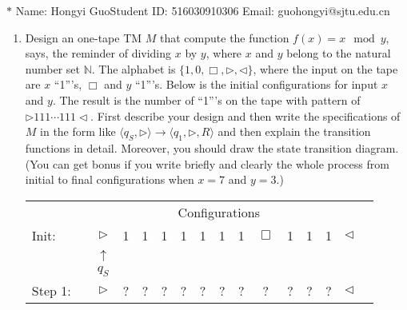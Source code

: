 \documentclass[12pt,a4paper]{article}
\theoremstyle{definition}
\begin{document}
\noindent

\noindent{}
\begin{center}
\footnotesize{\color{blue}$*$ Name: Hongyi Guo\quad Student ID: 516030910306 \quad Email: guohongyi@sjtu.edu.cn}
\end{center}

\begin{enumerate}
\item
Design an one-tape TM $M$ that compute the function $f(x) = x\mod y $, says, the reminder of dividing $x$ by $y$, where $x$ and $y$ belong to the natural number set $\mathbb{N}$. The alphabet is $\{1, 0, \Box, \triangleright, \triangleleft\}$, where the input on the tape are $x$ ``1'''s, $\Box$ and $y$ ``1'''s. Below is the initial configurations for input $x$ and $y$. The result is the number of ``1'''s on the tape with pattern of $\triangleright 111\cdots 111 \triangleleft$. First describe your design and then write the specifications of $M$ in the form like $\langle q_S, \triangleright \rangle \rightarrow \langle q_1, \triangleright,  R\rangle$ and then explain the transition functions in detail. Moreover, you should draw the state transition diagram. (You can get bonus if you write briefly and clearly the whole process from initial to final configurations when $x = 7$ and $y = 3$.)

\begin{center}
\begin{tabular}{ll|c|c|c|c|c|c|c|c|c|c|c|c|c|c}
	& \multicolumn{14}{c}{Configurations}\\[5pt]
	\cline{2-16}
	Init:& & $\triangleright$ &  1  & 1 & 1 & 1 & 1 & 1 & 1 & $\Box$ & 1 & 1 & 1 & $ \triangleleft$ & \\
	\cline{2-16}
	\multicolumn{2}{c}{} & \multicolumn{1}{c}{$\uparrow$} & \multicolumn{11}{c}{}\\[-4px]
	\multicolumn{2}{c}{} & \multicolumn{1}{c}{$q_S$} & \multicolumn{11}{c}{}\\[4pt]
	
	\cline{2-16}
	Step 1: & & $\triangleright$ &  ?  & ? & ? & ? & ? & ? & ? & ? & ? & ? & ? & $ \triangleleft$ & \\
	

\end{tabular}
\end{center}
\end{enumerate}
\end{document}
